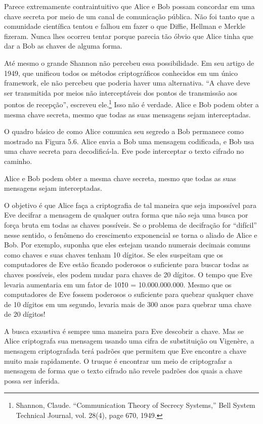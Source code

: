 \documentclass{book}
\begin{document}
Parece extremamente contraintuitivo que Alice e Bob possam concordar em uma chave secreta por meio de um canal de comunicação pública. Não foi tanto que a comunidade científica tentou e falhou em fazer o que Diffie, Hellman e Merkle fizeram. Nunca lhes ocorreu tentar porque parecia tão óbvio que Alice tinha que dar a Bob as chaves de alguma forma.

Até mesmo o grande Shannon não percebeu essa possibilidade. Em seu artigo de 1949, que unificou todos os métodos criptográficos conhecidos em um único framework, ele não percebeu que poderia haver uma alternativa. ``A chave deve ser transmitida por meios não interceptáveis dos pontos de transmissão aos pontos de recepção'', escreveu ele.\footnote{Shannon, Claude. “Communication Theory of Secrecy Systems,” Bell System Technical Journal, vol. 28(4), page 670, 1949.} Isso não é verdade. Alice e Bob podem obter a mesma chave secreta, mesmo que todas as suas mensagens sejam interceptadas.

O quadro básico de como Alice comunica seu segredo a Bob permanece como mostrado na Figura 5.6. Alice envia a Bob uma mensagem codificada, e Bob usa uma chave secreta para decodificá-la. Eve pode interceptar o texto cifrado no caminho.

Alice e Bob podem obter a mesma chave secreta, mesmo que todas as suas mensagens sejam interceptadas.

O objetivo é que Alice faça a criptografia de tal maneira que seja impossível para Eve decifrar a mensagem de qualquer outra forma que não seja uma busca por força bruta em todas as chaves possíveis. Se o problema de decifração for ``difícil'' nesse sentido, o fenômeno do crescimento exponencial se torna o aliado de Alice e Bob. Por exemplo, suponha que eles estejam usando numerais decimais comuns como chaves e suas chaves tenham 10 dígitos. Se eles suspeitam que os computadores de Eve estão ficando poderosos o suficiente para buscar todas as chaves possíveis, eles podem mudar para chaves de 20 dígitos. O tempo que Eve levaria aumentaria em um fator de 10\^10 = 10.000.000.000. Mesmo que os computadores de Eve fossem poderosos o suficiente para quebrar qualquer chave de 10 dígitos em um segundo, levaria mais de 300 anos para quebrar uma chave de 20 dígitos!

A busca exaustiva é sempre uma maneira para Eve descobrir a chave. Mas se Alice criptografa sua mensagem usando uma cifra de substituição ou Vigenère, a mensagem criptografada terá padrões que permitem que Eve encontre a chave muito mais rapidamente. O truque é encontrar um meio de criptografar a mensagem de forma que o texto cifrado não revele padrões dos quais a chave possa ser inferida.
\end{document}
